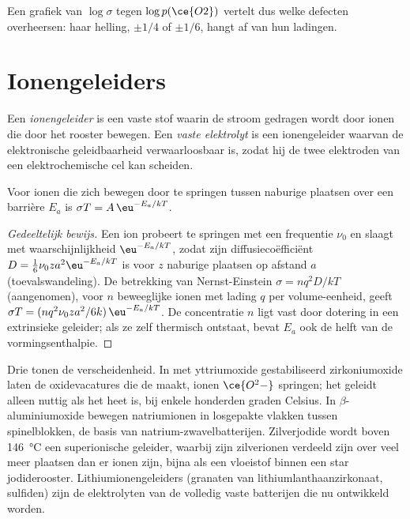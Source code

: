 Een grafiek van $\log\sigma$ tegen $\log p(\ce{O2})$ vertelt dus welke defecten overheersen: haar helling,
$\pm 1/4$ of $\pm 1/6$, hangt af van hun ladingen.

\section{Ionengeleiders}

\begin{definition}[Ionengeleiders]\label{def:b3:solid-state:ionic-conductor}
Een \emph{ionengeleider} is een vaste stof waarin de
stroom gedragen wordt door ionen die door het rooster bewegen. Een
\emph{vaste elektrolyt} is een ionengeleider
waarvan de elektronische geleidbaarheid verwaarloosbaar is, zodat hij de
twee elektroden van een elektrochemische cel kan scheiden.
\end{definition}

\begin{proposition}\label{prop:b3:solid-state:ionic-arrhenius}
Voor ionen die zich bewegen door te springen tussen naburige plaatsen
over een barrière $E_a$ is
$\sigma T = A\,\eu^{-E_a/kT}$.
\end{proposition}

\begin{proof}[Gedeeltelijk bewijs]
Een ion probeert te springen met een frequentie $\nu_0$ en slaagt met waarschijnlijkheid $\eu^{-E_a/kT}$,
zodat zijn diffusiecoëfficiënt $D = \tfrac16\nu_0 z a^2\eu^{-E_a/kT}$ is voor $z$ naburige plaatsen op
afstand $a$ (toevalswandeling). De betrekking van Nernst-Einstein $\sigma = nq^2D/kT$ (aangenomen), voor $n$
beweeglijke ionen met lading $q$ per volume-eenheid, geeft $\sigma T = (nq^2\nu_0za^2/6k)\,\eu^{-E_a/kT}$. De
concentratie $n$ ligt vast door dotering in een extrinsieke geleider;
als ze zelf thermisch ontstaat, bevat $E_a$ ook de helft van de vormingsenthalpie.
\end{proof}

Drie  tonen de verscheidenheid. In met yttriumoxide
gestabiliseerd zirkoniumoxide laten de oxidevacatures die de 
maakt, ionen $\ce{O^2-}$ springen; het geleidt alleen nuttig
als het heet is, bij enkele honderden graden Celsius. In $\beta$-aluminiumoxide bewegen natriumionen in
losgepakte vlakken tussen spinelblokken, de basis van
natrium-zwavelbatterijen. Zilverjodide wordt boven \qty{146}{\celsius} een
superionische geleider, waarbij zijn zilverionen verdeeld zijn over
veel meer plaatsen dan er ionen zijn, bijna als een vloeistof binnen een
star jodiderooster. Lithiumionengeleiders (granaten van
lithiumlanthaanzirkonaat, sulfiden) zijn de elektrolyten van de
volledig vaste batterijen die nu ontwikkeld worden.

